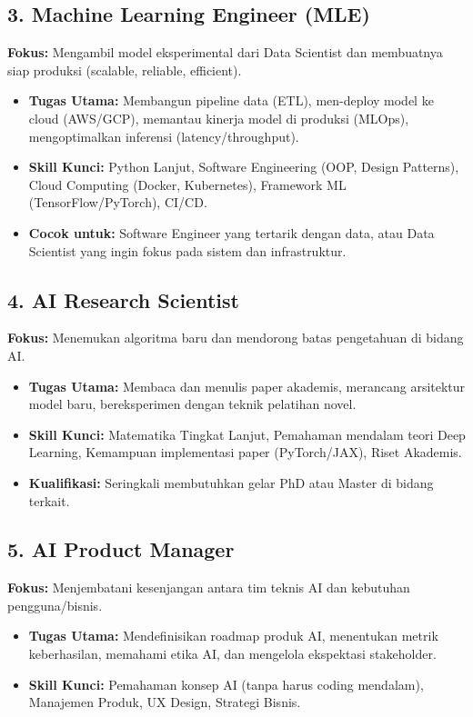 \subsection{3. Machine Learning Engineer (MLE)}
\textbf{Fokus:} Mengambil model eksperimental dari Data Scientist dan membuatnya siap produksi (scalable, reliable, efficient).
\begin{itemize}
    \item \textbf{Tugas Utama:} Membangun pipeline data (ETL), men-deploy model ke cloud (AWS/GCP), memantau kinerja model di produksi (MLOps), mengoptimalkan inferensi (latency/throughput).
    \item \textbf{Skill Kunci:} Python Lanjut, Software Engineering (OOP, Design Patterns), Cloud Computing (Docker, Kubernetes), Framework ML (TensorFlow/PyTorch), CI/CD.
    \item \textbf{Cocok untuk:} Software Engineer yang tertarik dengan data, atau Data Scientist yang ingin fokus pada sistem dan infrastruktur.
\end{itemize}

\subsection{4. AI Research Scientist}
\textbf{Fokus:} Menemukan algoritma baru dan mendorong batas pengetahuan di bidang AI.
\begin{itemize}
    \item \textbf{Tugas Utama:} Membaca dan menulis paper akademis, merancang arsitektur model baru, bereksperimen dengan teknik pelatihan novel.
    \item \textbf{Skill Kunci:} Matematika Tingkat Lanjut, Pemahaman mendalam teori Deep Learning, Kemampuan implementasi paper (PyTorch/JAX), Riset Akademis.
    \item \textbf{Kualifikasi:} Seringkali membutuhkan gelar PhD atau Master di bidang terkait.
\end{itemize}

\subsection{5. AI Product Manager}
\textbf{Fokus:} Menjembatani kesenjangan antara tim teknis AI dan kebutuhan pengguna/bisnis.
\begin{itemize}
    \item \textbf{Tugas Utama:} Mendefinisikan roadmap produk AI, menentukan metrik keberhasilan, memahami etika AI, dan mengelola ekspektasi stakeholder.
    \item \textbf{Skill Kunci:} Pemahaman konsep AI (tanpa harus coding mendalam), Manajemen Produk, UX Design, Strategi Bisnis.
\end{itemize}

